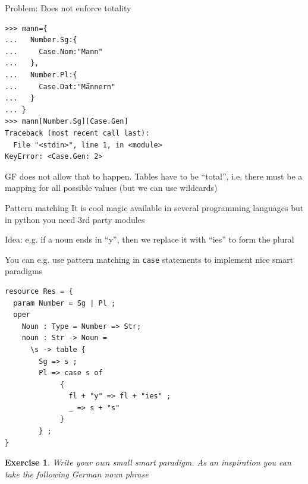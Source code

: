 \documentclass{beamer}
\newtheorem{exercise}{Exercise}
\begin{document}
\begin{frame}[fragile]
Problem: Does not enforce totality
\begin{verbatim}
>>> mann={
...   Number.Sg:{
...     Case.Nom:"Mann"
...   },
...   Number.Pl:{
...     Case.Dat:"Männern"
...   }
... }
>>> mann[Number.Sg][Case.Gen]
Traceback (most recent call last):
  File "<stdin>", line 1, in <module>
KeyError: <Case.Gen: 2>
\end{verbatim}
GF does not allow that to happen. Tables have to be ``total'', i.e. there must be a mapping for all possible values (but we can use wildcards)
\end{frame}
\begin{frame}{Pattern matching}
  It is cool magic available in several programming languages but in python you need 3rd party modules

  Idea: e.g. if a noun ends in ``y'', then we replace it with ``ies'' to form the plural

  You can e.g. use pattern matching in \texttt{case} statements to implement nice smart paradigms
\end{frame}

\begin{frame}[fragile]
  \begin{lstlisting}
resource Res = {
  param Number = Sg | Pl ;
  oper
    Noun : Type = Number => Str;
    noun : Str -> Noun =
      \s -> table {
        Sg => s ; 
        Pl => case s of
             { 
               fl + "y" => fl + "ies" ;
               _ => s + "s"
             }
        } ;
}

  \end{lstlisting}
\end{frame}

\begin{frame}
  \begin{exercise}
    Write your own small smart paradigm. As an inspiration you can take the following German noun phrase
  \end{exercise}
\end{frame}
\end{document}
